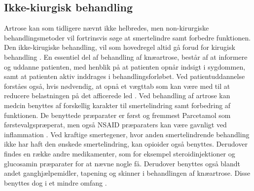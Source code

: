 \subsection{Ikke-kiurgisk behandling}
Artrose kan som tidligere nævnt ikke helbredes, men non-kirurgiske behandlingsmetoder vil fortrinsvis søge at smertelindre samt forbedre funktionen. Den ikke-kirugiske behandling, vil som hovedregel altid gå forud for kirugisk behandling \citep{brostrom2012}. En essentiel del af behandling af knæartrose, består af at informere og uddanne patienten, med henblik på at patienten opnår indsigt i sygdommen, samt at patienten aktiv inddrages i behandlingsforløbet. Ved  patientuddannelse forståes også, hvis nødvendig, at opnå et vægttab som kan være med til at reducere belastningen på det afficerede led \citep{brostrom2012}.
Ved behandling af artrose kan medcin benyttes af forskellig karakter til smertelindring samt forbedring af funktionen. De benyttede præparater er først og fremmest Parcetamol som  førstevalgspræperat, men  også NSAID præparaters kan være gavnligt ved inflammation \citep{schroder}. Ved kraftige smertegener, hvor anden smertelindrende behandling ikke har haft den ønskede smertelindring, kan opioider også benyttes. Derudover findes en række andre medikamenter, som for eksempel steroidinjektioner og glucosamin præparater for at nævne nogle få. Derudover benyttes også blandt andet ganghjælpemidler, tapening og skinner i behandlingen af knæartrose. Disse benyttes dog i et mindre omfang \citep{brostrom2012}.\\\\

